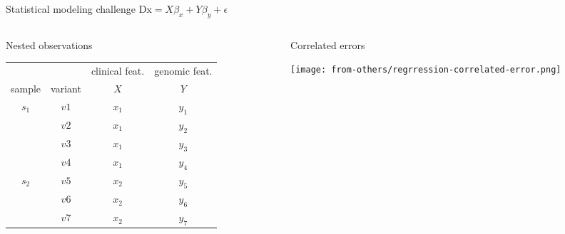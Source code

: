 \documentclass{beamer}
\begin{document}
\begin{frame}{Statistical modeling challenge}
	\(\mathrm{Dx} = X\beta_x + Y\beta_y + \epsilon\)
\footnotesize
\begin{columns}[t]
\begin{column}{0.6\textwidth}
\begin{center}
Nested observations
\end{center}
\begin{center}
\begin{tabular}{cc|c|c}
& & clinical feat. & genomic feat. \\
sample & variant & \(X\) & \(Y\) \\
\hline
\multirow{4}{*}{\(s_1\)} & \(v1\) & \(x_1\) & \(y_1\) \\
& \(v2\) & \(x_1\) & \(y_2\) \\
& \(v3\) & \(x_1\) & \(y_3\) \\
& \(v4\) & \(x_1\) & \(y_4\) \\
\hline
\multirow{3}{*}{\(s_2\)} & \(v5\) & \(x_2\) & \(y_5\) \\
& \(v6\) & \(x_2\) & \(y_6\) \\
& \(v7\) & \(x_2\) & \(y_7\) \\
\end{tabular}
\end{center}
\end{column}

\begin{column}{0.4\textwidth}
\begin{center}
Correlated errors
\end{center}
\texttt{[image: from-others/regrression-correlated-error.png]}
\end{column}
\end{columns}
\end{frame}
\end{document}
